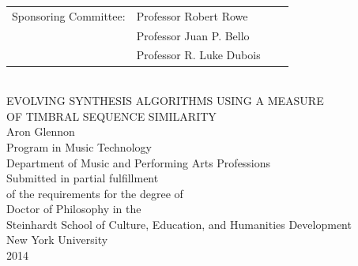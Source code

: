 \documentclass[12pt]{report} 	%
\numberwithin{figure}{chapter}
\numberwithin{table}{chapter}
\numberwithin{equation}{chapter}
\begin{document}
\begin{titlepage}
\begin{center}
\begin{tabular}{llll}
  Sponsoring Committee: & Professor Robert Rowe\\
  & Professor Juan P. Bello\\
  & Professor R. Luke Dubois\\
\end{tabular}
\\
\vfill
EVOLVING SYNTHESIS ALGORITHMS USING A MEASURE\\
\vspace{\baselineskip}
OF TIMBRAL SEQUENCE SIMILARITY\\
\vspace{\baselineskip}
\vspace{\baselineskip}
\vspace{\baselineskip}
Aron Glennon\\
\vspace{\baselineskip}
Program in Music Technology\\
Department of Music and Performing Arts Professions\\
\vfill
Submitted in partial fulfillment\\
of the requirements for the degree of\\
Doctor of Philosophy in the\\
Steinhardt School of Culture, Education, and Humanities Development\\
New York University\\
2014\\
\end{center}
\end{titlepage}
\end{document}
